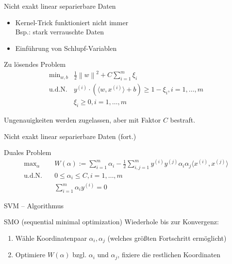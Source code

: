\documentclass[xcolor={dvipsnames,svgnames}]{beamer}
\newcommand{\inner}[2]{\langle{} #1, #2 \rangle{}}
\newcommand{\norm}[1]{\left\lVert#1\right\rVert}
\begin{document}
\begin{frame}{Nicht exakt linear separierbare Daten}
  \begin{itemize}
  \item Kernel-Trick funktioniert nicht immer \\
  Bsp.: stark verrauschte Daten
  \item Einführung von Schlupf-Variablen
  \end{itemize}

  \begin{exampleblock}{Zu lösendes Problem}
    \[
      \begin{array}{rl}
        \text{min}_{w,b} & \frac{1}{2}\norm{w}^2 + C\sum_{i=1}^m \xi_i \\
        \text{u.d.N.} & y^{(i)} \cdot (\inner{w}{x^{(i)}} + b) \geq 1 - \xi_i, 
                        i = 1, \ldots, m \\
                         & \xi_i \geq 0, i = 1, \ldots, m
      \end{array}
    \]
  \end{exampleblock}

  Ungenauigkeiten werden zugelassen, aber mit Faktor $C$ bestraft.
\end{frame}

\begin{frame}{Nicht exakt linear separierbare Daten (fort.)}
  \begin{exampleblock}{Duales Problem}
    \vspace{-1em}
    \begin{align*}
        \text{max}_{\alpha} \quad& W(\alpha) := \sum_{i=1}^m\alpha_i 
                              - \frac{1}{2}\sum_{i,j=1}^m y^{(i)}y^{(j)}\alpha_i\alpha_j\inner{x^{(i)}}{x^{(j)}}  \\
        \text{u.d.N.} \quad& 0 \leq \alpha_i \leq C, i = 1, \ldots, m \\
                            & \sum_{i=1}^m \alpha_i y^{(i)} = 0
    \end{align*}
  \end{exampleblock}
\end{frame}

\begin{frame}{SVM -- Algorithmus}

  \begin{block}{SMO (sequential minimal optimization) \cite{PlattSMO}}
    Wiederhole bis zur Konvergenz:
    \begin{enumerate}
    \item Wähle Koordinatenpaar $\alpha_i,\alpha_j$ (welches größten Fortschritt
      ermöglicht)
    \item Optimiere $W(\alpha)$ bzgl. $\alpha_i$ und $\alpha_j$, fixiere die
      restlichen Koordinaten
    \end{enumerate}
  \end{block}

\end{frame}
\end{document}
